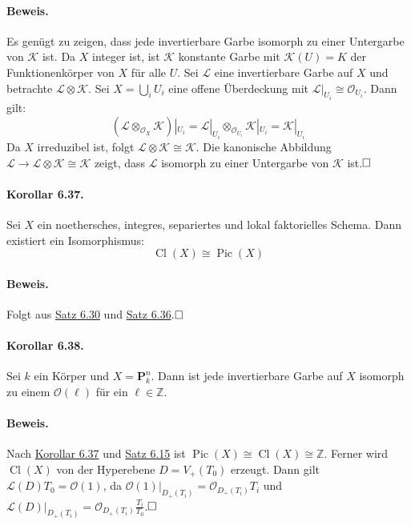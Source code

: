 \documentclass[11pt,b5paper,openany]{memoir}
\def \qed {$\hfill\square$}
\begin{document}
\paragraph{Beweis.} Es genügt zu zeigen, dass jede invertierbare Garbe isomorph zu einer Untergarbe von $\mathcal{K}$ ist. Da $X$ integer ist, ist $\mathcal{K}$ konstante Garbe mit $\mathcal{K}(U)=K$ der Funktionenkörper von $X$ für alle $U$. Sei $\mathcal{L}$ eine invertierbare Garbe auf $X$ und betrachte $\mathcal{L}\otimes\mathcal{K}$. Sei $X=\bigcup_i U_i$ eine offene Überdeckung mit $\mathcal{L}|_{U_i}\cong\mathcal{O}_{U_i}$. Dann gilt:
\[(\mathcal{L}\otimes_{\mathcal{O}_X}\mathcal{K})|_{U_i}=\mathcal{L}|_{U_i}\otimes_{\mathcal{O}_{U_i}}\mathcal{K}|_{U_i}=\mathcal{K}|_{U_i} \]
Da $X$ irreduzibel ist, folgt $\mathcal{L}\otimes\mathcal{K}\cong\mathcal{K}$. Die kanonische Abbildung $\mathcal{L}\to\mathcal{L}\otimes\mathcal{K}\cong\mathcal{K}$ zeigt, dass $\mathcal{L}$ isomorph zu einer Untergarbe von $\mathcal{K}$ ist.\qed

\paragraph{Korollar 6.37.}\label{6.37} Sei $X$ ein noethersches, integres, separiertes und lokal faktorielles Schema. Dann existiert ein Isomorphismus:
\[\operatorname{Cl}(X)\cong\operatorname{Pic}(X) \]

\paragraph{Beweis.} Folgt aus \hyperref[6.30]{Satz 6.30} und \hyperref[6.36]{Satz 6.36}.\qed

\paragraph{Korollar 6.38.}\label{6.38} Sei $k$ ein Körper und $X=\mathbf{P}_k^n$. Dann ist jede invertierbare Garbe auf $X$ isomorph zu einem $\mathcal{O}(\ell)$ für ein $\ell\in\mathbb{Z}$.

\paragraph{Beweis.} Nach \hyperref[6.37]{Korollar 6.37} und \hyperref[6.15]{Satz 6.15} ist $\operatorname{Pic}(X)\cong \operatorname{Cl}(X)\cong\mathbb{Z}$. Ferner wird $\operatorname{Cl}(X)$ von der Hyperebene $D=V_+(T_0)$ erzeugt. Dann gilt $\mathcal{L}(D)T_0=\mathcal{O}(1)$, da $\mathcal{O}(1)|_{D_+(T_i)}=\mathcal{O}_{D_+(T_i)}T_i$ und $\mathcal{L}(D)|_{D_+(T_i)}=\mathcal{O}_{D_+(T_i)}\frac{T_i}{T_0}$.\qed
\end{document}
